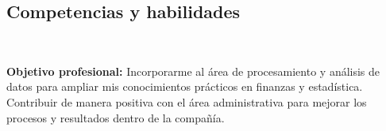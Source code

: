 \documentclass[]{friggeri-cv}
\begin{document}
\begin{aside}
  \section{Competencias y habilidades}
    ~
\end{aside}
\textbf{Objetivo profesional:}
Incorporarme al área de procesamiento y análisis de datos para ampliar mis conocimientos prácticos en finanzas y estadística. Contribuir de manera positiva con el área administrativa para mejorar los procesos y resultados dentro de la compañía.
\vspace{-0.4cm}
\end{document}
